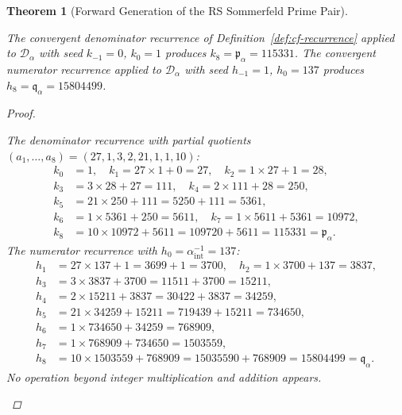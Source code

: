 \documentclass[11pt, letterpaper]{article}
\newcommand{\aSC}{\alpha^{-1}_{\mathrm{int}}}
\newcommand{\pa}{\mathfrak{p}_\alpha}
\newcommand{\qa}{\mathfrak{q}_\alpha}
\newcommand{\Da}{\mathcal{D}_\alpha}
\theoremstyle{definition}
\theoremstyle{plain}
\newtheorem{theorem}{Theorem}[section]
\begin{document}
\begin{theorem}[Forward Generation of the RS Sommerfeld Prime Pair]
\label{thm:sommerfeld-forward}
\begin{rsbox}
The convergent denominator recurrence of Definition~\ref{def:cf-recurrence}
applied to $\Da$ with seed $k_{-1}=0$, $k_0=1$ produces $k_8=\pa=115331$.
The convergent numerator recurrence applied to $\Da$ with seed $h_{-1}=1$,
$h_0=137$ produces $h_8=\qa=15804499$.
\end{rsbox}
\begin{proof}
\begin{rsbox}
The denominator recurrence with partial quotients
$(a_1,\ldots,a_8)=(27,1,3,2,21,1,1,10)$:
\begin{align*}
k_0&=1,\quad k_1=27\times1+0=27,\quad k_2=1\times27+1=28,\\
k_3&=3\times28+27=111,\quad k_4=2\times111+28=250,\\
k_5&=21\times250+111=5250+111=5361,\\
k_6&=1\times5361+250=5611,\quad k_7=1\times5611+5361=10972,\\
k_8&=10\times10972+5611=109720+5611=115331=\pa.
\end{align*}
The numerator recurrence with $h_0=\aSC=137$:
\begin{align*}
h_1&=27\times137+1=3699+1=3700,\quad h_2=1\times3700+137=3837,\\
h_3&=3\times3837+3700=11511+3700=15211,\\
h_4&=2\times15211+3837=30422+3837=34259,\\
h_5&=21\times34259+15211=719439+15211=734650,\\
h_6&=1\times734650+34259=768909,\\
h_7&=1\times768909+734650=1503559,\\
h_8&=10\times1503559+768909=15035590+768909=15804499=\qa.
\end{align*}
No operation beyond integer multiplication and addition appears.
\end{rsbox}
\end{proof}
\end{theorem}
\end{document}
